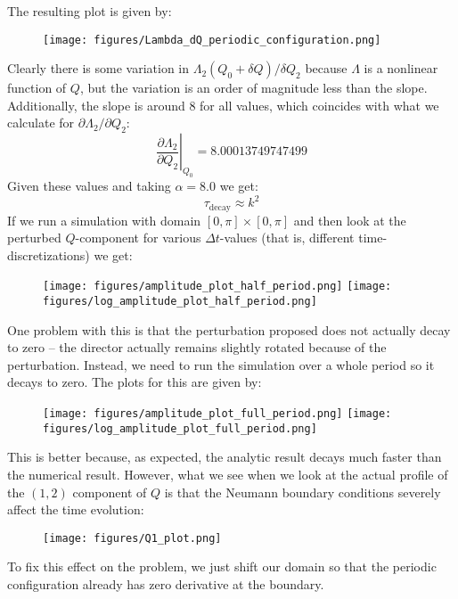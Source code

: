 \documentclass[reqno]{article}
\begin{document}
The resulting plot is given by:
\begin{figure}[h]
    \centering
    \texttt{[image: figures/Lambda\_dQ\_periodic\_configuration.png]}
\end{figure}
Clearly there is some variation in $\Lambda_2(Q_0 + \delta Q) / \delta Q_2$ because $\Lambda$ is a nonlinear function of $Q$, but the variation is an order of magnitude less than the slope.
Additionally, the slope is around 8 for all values, which coincides with what we calculate for $\partial \Lambda_2 / \partial Q_2$:
\begin{equation}
    \left. \frac{\partial \Lambda_2}{\partial Q_2} \right|_{Q_0} = 8.00013749747499
\end{equation}
Given these values and taking $\alpha = 8.0$ we get:
\begin{equation}
    \tau_\text{decay} \approx k^2
\end{equation}
If we run a simulation with domain $[0, \pi]\times [0, \pi]$ and then look at the perturbed $Q$-component for various $\Delta t$-values (that is, different time-discretizations) we get:
\begin{figure}[H]
    \centering
    \texttt{[image: figures/amplitude\_plot\_half\_period.png]}
    \texttt{[image: figures/log\_amplitude\_plot\_half\_period.png]}
\end{figure}

One problem with this is that the perturbation proposed does not actually decay to zero -- the director actually remains slightly rotated because of the perturbation.
Instead, we need to run the simulation over a whole period so it decays to zero. 
The plots for this are given by:
\begin{figure}[H]
    \centering
    \texttt{[image: figures/amplitude\_plot\_full\_period.png]}
    \texttt{[image: figures/log\_amplitude\_plot\_full\_period.png]}
\end{figure}
This is better because, as expected, the analytic result decays much faster than the numerical result.
However, what we see when we look at the actual profile of the $(1, 2)$ component of $Q$ is that the Neumann boundary conditions severely affect the time evolution:
\begin{figure}[H]
    \centering
    \texttt{[image: figures/Q1\_plot.png]}
\end{figure}
To fix this effect on the problem, we just shift our domain so that the periodic configuration already has zero derivative at the boundary.
\end{document}
